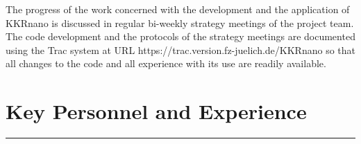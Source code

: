 \documentclass [a4paper, 12pt]{article}
\begin{document}




The progress of the work concerned with the development and the application of KKRnano
is discussed in regular bi-weekly strategy meetings of the project team.
The code development and the protocols of the strategy meetings are documented
using the Trac system at URL https://trac.version.fz-juelich.de/KKRnano so
that all changes to the code and all experience with its use are readily available.


\bigskip

\section{Key Personnel and Experience}
\rule{\textwidth}{0.4pt}\\

\end{document}
